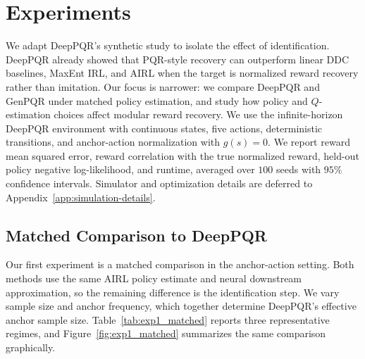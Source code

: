 \section{Experiments}
\label{sec:experiments}

We adapt DeepPQR's synthetic study to isolate the effect of identification. DeepPQR already showed that PQR-style recovery can outperform linear DDC baselines, MaxEnt IRL, and AIRL when the target is normalized reward recovery rather than imitation. Our focus is narrower: we compare DeepPQR and GenPQR under matched policy estimation, and study how policy and \(Q\)-estimation choices affect modular reward recovery. We use the infinite-horizon DeepPQR environment with continuous states, five actions, deterministic transitions, and anchor-action normalization with \(g(s)=0\). We report reward mean squared error, reward correlation with the true normalized reward, held-out policy negative log-likelihood, and runtime, averaged over \(100\) seeds with \(95\%\) confidence intervals. Simulator and optimization details are deferred to Appendix~\ref{app:simulation-details}.

\subsection{Matched Comparison to DeepPQR}
\label{sec:experiments:matched}

Our first experiment is a matched comparison in the anchor-action setting. Both methods use the same AIRL policy estimate and neural downstream approximation, so the remaining difference is the identification step. We vary sample size and anchor frequency, which together determine DeepPQR's effective anchor sample size. Table~\ref{tab:exp1_matched} reports three representative regimes, and Figure~\ref{fig:exp1_matched} summarizes the same comparison graphically.

